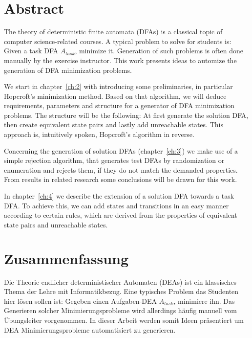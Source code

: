 
\chapter{Abstract}


The theory of deterministic finite automata (DFAs) is a classical topic of computer science-related courses. A typical problem to solve for students is: Given a task DFA $A_{task}$, minimize it. Generation of such problems is often done manually by the exercise instructor. This work presents ideas to automize the generation of DFA minimization problems.


We start in chapter~\ref{ch:2} with introducing some preliminaries, in particular Hopcroft's minimization method. Based on that algorithm, we will deduce requirements, parameters and structure for a generator of DFA minimization problems. The structure will be the following: At first generate the solution DFA, then create equivalent state pairs and lastly add unreachable states. This approach is, intuitively spoken, Hopcroft's algorithm in reverse.


Concerning the generation of solution DFAs (chapter~\ref{ch:3}) we make use of a simple rejection algorithm, that generates test DFAs by randomization or enumeration and rejects them, if they do not match the demanded properties. From results in related research some conclusions will be drawn for this work.


In chapter~\ref{ch:4} we describe the extension of a solution DFA towards a task DFA. To achieve this, we can add states and transitions in an easy manner according to certain rules, which are derived from the properties of equivalent state pairs and unreachable states. 



\chapter{Zusammenfassung}

Die Theorie endlicher deterministischer Automaten (DEAs) ist ein klassisches Thema der Lehre mit Informatikbezug. Eine typisches Problem das Studenten hier lösen sollen ist: Gegeben einen Aufgaben-DEA $A_{task}$, minimiere ihn. Das Generieren solcher Minimierungsprobleme wird allerdings häufig manuell vom Übungsleiter vorgenommen. In dieser Arbeit werden somit Ideen präsentiert um DEA Minimierungsprobleme automatisiert zu generieren.

